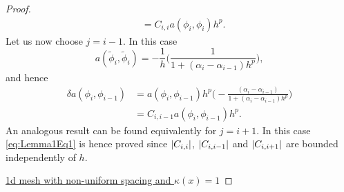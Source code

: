 \documentclass[10pt]{article}
\begin{document}
\begin{proof}
\begin{equation}
\begin{aligned}
		&= C_{i,i} a(\phi_i, \phi_i)h^p.
	\end{aligned}
	\end{equation}
	Let us now choose $j = i-1$. In this case
	\begin{equation}
		a(\tilde \phi_i, \tilde \phi_i) = -\frac{1}{h}\Big(\frac{1}{1 + (\alpha_i - \alpha_{i-1})h^p}\Big),
	\end{equation}
	and hence
	\begin{equation}
	\begin{aligned}
		\delta a(\phi_i, \phi_{i-1}) &= a(\phi_i, \phi_{i-1})h^p\Big(-\frac{(\alpha_i - \alpha_{i-1})}{1 + (\alpha_i - \alpha_{i-1})h^p}\Big) \\
		&= C_{i,i-1} a(\phi_i, \phi_{i-1})h^p.
	\end{aligned}
	\end{equation}
	An analogous result can be found equivalently for $j = i+1$. In this case \eqref{eq:Lemma1Eq1} is hence proved since $\lvert C_{i,i}\rvert$, $\lvert C_{i, i-1}\rvert$ and $\lvert C_{i, i+1}\rvert$ are bounded independently of $h$.
		
	\underline{1d mesh with non-uniform spacing and $\kappa(x) = 1$}
	

\end{proof}
\end{document}
